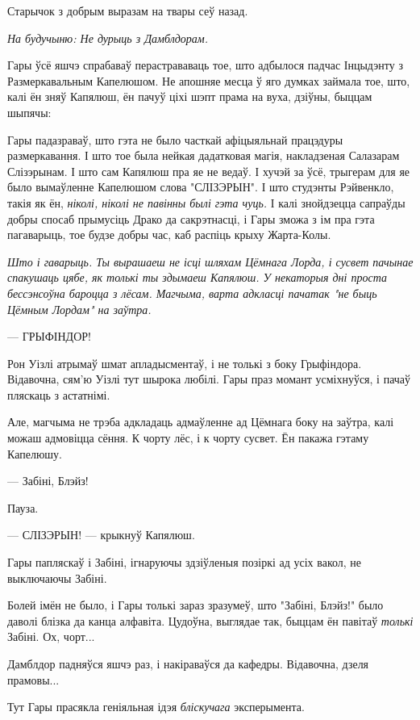 Старычок з добрым выразам на твары сеў назад.

\emph{На будучыню: Не дурыць з Дамблдорам.}

Гары ўсё яшчэ спрабаваў перастрававаць тое, што адбылося падчас Інцыдэнту з Размеркавальным
Капелюшом. Не апошняе месца ў яго думках займала тое, што, калі ён зняў Капялюш,
ён пачуў ціхі шэпт прама на вуха, дзіўны, быццам шыпячы: 


Гары падазраваў, што гэта не было часткай афіцыяльнай працэдуры размеркавання.
І што тое была нейкая дадатковая магія, накладзеная Салазарам Слізэрынам. І што
сам Капялюш пра яе не ведаў. І хучэй за ўсё, трыгерам для яе было 
вымаўленне Капелюшом слова "СЛІЗЭРЫН". І што студэнты Рэйвенкло, такія як ён, 
\emph{ніколі, ніколі не павінны былі гэта чуць.} І калі знойдзецца сапраўды добры 
спосаб прымусіць Драко да сакрэтнасці, і Гары зможа з ім пра гэта пагаварыць,
тое будзе добры час, каб распіць крыху Жарта-Колы.

\emph{Што і гаварыць. Ты вырашаеш не ісці шляхам Цёмнага Лорда, і сусвет 
пачынае спакушаць цябе, як толькі ты здымаеш Капялюш. У некаторыя дні проста
бессэнсоўна бароцца з лёсам. Магчыма, варта адкласці пачатак "не быць Цёмным Лордам"
на заўтра.}

--- ГРЫФІНДОР!

Рон Уізлі атрымаў шмат апладысментаў, і не толькі з боку Грыфіндора.
Відавочна, сям'ю Уізлі тут шырока любілі. Гары праз момант усміхнуўся, і 
пачаў пляскаць з астатнімі.

Але, магчыма не трэба адкладаць адмаўленне ад Цёмнага боку на заўтра,
калі можаш адмовіцца сёння. К чорту лёс, і к чорту сусвет. Ён пакажа гэтаму
Капелюшу.

--- Забіні, Блэйз!

Пауза.

--- СЛІЗЭРЫН! --- крыкнуў Капялюш.

Гары папляскаў і Забіні, ігнаруючы здзіўленыя позіркі ад усіх вакол, не выключаючы 
Забіні.

Болей імён не было, і Гары толькі зараз зразумеў, што "Забіні, Блэйз!" было
даволі блізка да канца алфавіта. Цудоўна, выглядае так, быццам ён павітаў  \emph{толькі} 
Забіні. Ох, чорт...

Дамблдор падняўся яшчэ раз, і накіраваўся да кафедры. Відавочна, дзеля прамовы...

Тут Гары прасякла геніяльная ідэя \emph{бліскучага} эксперымента.

